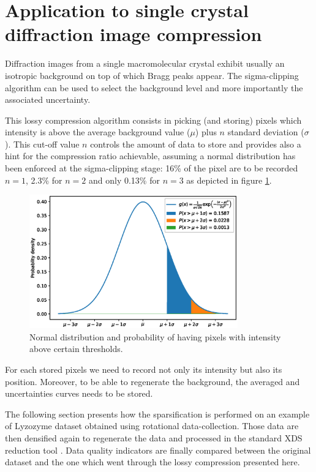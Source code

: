 \documentclass[preprint]{iucr}              %
\begin{document}
\section{Application to single crystal diffraction image compression}
Diffraction images from a single macromolecular crystal exhibit usually an isotropic background on top of which Bragg peaks appear.
The sigma-clipping algorithm can be used to select the background level and more importantly the associated uncertainty.

This lossy compression algorithm consists in picking (and storing) pixels which intensity is above the average background value ($\mu$) plus $n$ standard deviation ($\sigma$). 
This cut-off value $n$ controls the amount of data to store and provides also a hint for the compression ratio achievable, assuming a normal distribution has been enforced at the sigma-clipping stage: 16\% of the pixel are to be recorded $n=1$,  2.3\% for $n=2$ and only 0.13\% for $n=3$ as depicted in figure \ref{distribution}.
\begin{figure}
\label{distribution}
\begin{center}
\includegraphics[width=9cm]{distribution}
\caption{Normal distribution and probability of having pixels with intensity above certain thresholds.}
\end{center}
\end{figure}

For each stored pixels we need to record not only its intensity but also its position. 
Moreover, to be able to regenerate the background, the averaged and uncertainties curves needs to be stored.

The following section presents how the sparsification is performed on an example of Lyzozyme dataset obtained using rotational data-collection.
Those data are then densified again to regenerate the data and processed in the standard XDS reduction tool \cite{xds}.
Data quality indicators are finally compared between the original dataset and the one which went through the lossy compression presented here.
\end{document}
